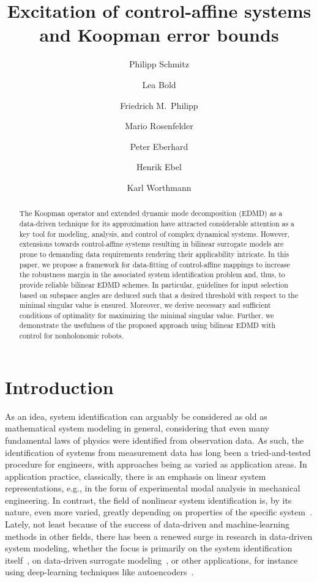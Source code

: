 \documentclass[a4paper, reqno]{amsart}
\title[Excitation of control-affine systems and Koopman error bounds]{Excitation of control-affine systems and Koopman error bounds}
\author[Schmitz et al.]{Philipp Schmitz}
\author[]{Lea Bold}
\author[]{Friedrich M.\ Philipp}
\author[]{Mario Rosenfelder}
\author[]{Peter Eberhard}
\author[]{Henrik Ebel}
\author[]{Karl Worthmann}
\begin{document}
\tikzexternaldisable
	
	\begin{abstract}
	The Koopman operator and extended dynamic mode decomposition (EDMD) as a data-driven technique for its approximation have attracted considerable attention as a key tool for modeling, analysis, and control of complex dynamical systems. 
    However, extensions towards control-affine systems resulting in bilinear surrogate models are prone to demanding data requirements rendering their applicability intricate. 
    In this paper, we propose a framework for data-fitting of control-affine mappings to increase the robustness margin in the associated system identification problem and, thus, to provide reliable bilinear EDMD schemes.
    In particular, guidelines for input selection based on subspace angles are deduced such that a desired threshold with respect to the minimal singular value is ensured. Moreover, we derive necessary and sufficient conditions of optimality for maximizing the minimal singular value. 
    Further, we demonstrate the usefulness of the proposed approach using bilinear EDMD with control for nonholonomic robots.
	\end{abstract}
    
    \maketitle
	
	\section{Introduction}
    
As an idea, system identification can arguably be considered as old as mathematical system modeling in general, considering that even many fundamental laws of physics were identified from observation data. 
As such, the identification of systems from measurement data has long been a tried-and-tested procedure for engineers, with approaches being as varied as application areas. 
In application practice, classically, there is an emphasis on linear system representations, e.g., in the form of experimental modal analysis in mechanical engineering. 
In contrast, the field of nonlinear system identification is, by its nature, even more varied, greatly depending on properties of the specific system~\cite{schoukens2019nonlinear}. 
Lately, not least because of the success of data-driven and machine-learning methods in other fields, there has been a renewed surge in research in data-driven system modeling, whether the focus is primarily on the system identification itself~\cite{schoukens2019nonlinear}, on data-driven surrogate modeling~\cite{kutz2016dynamic}, or other applications, for instance using deep-learning techniques like autoencoders~\cite{beintema2023deep,masti2021learning}. 
\end{document}

